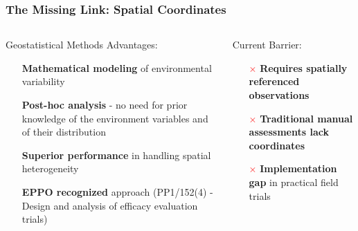\documentclass[aspectratio=43]{beamer}
\begin{document}
\begin{frame}
    \frametitle{\small The Missing Link: Spatial Coordinates}
    
    \begin{columns}
        \begin{column}{0.5\textwidth}
            \begin{block}{Geostatistical Methods Advantages:}
                \begin{itemize}
                    \item[\textcolor{green}{\checkmark}] \textbf{Mathematical modeling} of environmental variability
                    \item[\textcolor{green}{\checkmark}] \textbf{Post-hoc analysis} - no need for prior knowledge of the environment variables and of their distribution
                    \item[\textcolor{green}{\checkmark}] \textbf{Superior performance} in handling spatial heterogeneity
                    \item[\textcolor{green}{\checkmark}] \textbf{EPPO recognized} approach \scriptsize (PP1/152(4) - Design and analysis of efficacy evaluation trials)
                \end{itemize}
            \end{block}
        \end{column}
        
        \begin{column}{0.5\textwidth}
            \begin{alertblock}{Current Barrier:}
                \begin{itemize}
                    \item[\textcolor{red}{\(\times\)}] \textbf{Requires spatially referenced observations}
                    \item[\textcolor{red}{\(\times\)}] \textbf{Traditional manual assessments lack coordinates}
                    \item[\textcolor{red}{\(\times\)}] \textbf{Implementation gap} in practical field trials
                \end{itemize}
            \end{alertblock}
        \end{column}
    \end{columns}
\end{frame}
\end{document}

